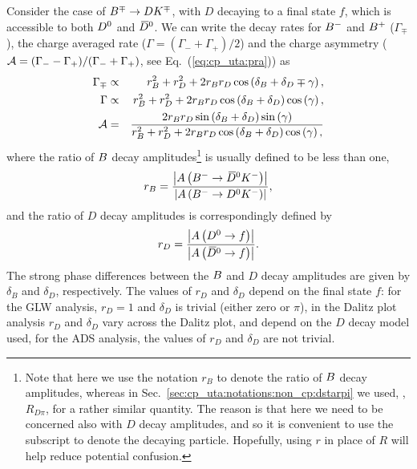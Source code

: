 Consider the case of $B^\mp \to D K^\mp$,
with $D$ decaying to a final state $f$,
which is accessible to both $D^0$ and $\kern 0.2em\overline{\kern -0.2em D}{}^0$.
We can write the decay rates for $B^{-}$ and $B^{+}$ ($\Gamma_\mp$), 
the charge averaged rate ($\Gamma = (\Gamma_- + \Gamma_+)/2$)
and the charge asymmetry 
(${\cal A} = (\Gamma_- - \Gamma_+)/(\Gamma_- + \Gamma_+)$, see Eq.~(\ref{eq:cp_uta:pra})) as 
\begin{eqnarray}
  \label{eq:cp_uta:dk:rate_def}
  \Gamma_\mp  & \propto & 
  r_B^2 + r_D^2 + 2 r_B r_D \cos \left( \delta_B + \delta_D \mp \gamma \right), \\
  \label{eq:cp_uta:dk:av_rate_def}
  \Gamma & \propto &  
  r_B^2 + r_D^2 + 2 r_B r_D \cos \left( \delta_B + \delta_D \right) \cos \left( \gamma \right), \\
  \label{eq:cp_uta:dk:acp_def}
  {\cal A} & = & 
  \frac{
    2 r_B r_D \sin \left( \delta_B + \delta_D \right) \sin \left( \gamma \right)
  }{
    r_B^2 + r_D^2 + 2 r_B r_D \cos \left( \delta_B + \delta_D \right) \cos \left( \gamma \right),  
  }
\end{eqnarray}
where the ratio of $B$ decay amplitudes\footnote{
  Note that here we use the notation $r_B$ to denote the ratio
  of $B$ decay amplitudes, 
  whereas in Sec.~\ref{sec:cp_uta:notations:non_cp:dstarpi} 
  we used, \eg, $R_{D\pi}$, for a rather similar quantity.
  The reason is that here we need to be concerned also with 
  $D$ decay amplitudes,
  and so it is convenient to use the subscript to denote the decaying particle.
  Hopefully, using $r$ in place of $R$ will help reduce potential confusion.
} 
is usually defined to be less than one,
\begin{equation}
  \label{eq:cp_uta:dk:rb_def}
  r_B = 
  \frac{
    \left| A\left( B^{-} \to \kern 0.2em\overline{\kern -0.2em D}{}^0 K^- \right) \right|
  }{
    \left| A\left( B^{-} \to D^0  K^- \right) \right|
  },
\end{equation}
and the ratio of $D$ decay amplitudes is correspondingly defined by
\begin{equation}
  \label{eq:cp_uta:dk:rd_def}
  r_D = 
  \frac{
    \left| A\left( D^0  \to f \right) \right|
  }{
    \left| A\left( \kern 0.2em\overline{\kern -0.2em D}{}^0 \to f \right) \right|
  }.
\end{equation}
The strong phase differences between the $B$ and $D$ decay amplitudes 
are given by $\delta_B$ and $\delta_D$, respectively.
The values of $r_D$ and $\delta_D$ depend on the final state $f$:
for the GLW analysis, $r_D = 1$ and $\delta_D$ is trivial (either zero or $\pi$),
in the Dalitz plot analysis $r_D$ and $\delta_D$ vary across the Dalitz plot,
and depend on the $D$ decay model used,
for the ADS analysis, the values of $r_D$ and $\delta_D$ are not trivial.

